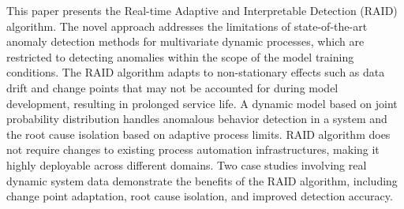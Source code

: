 This paper presents the Real-time Adaptive and Interpretable Detection (RAID) algorithm. The novel approach addresses the limitations of state-of-the-art anomaly detection methods for multivariate dynamic processes, which are restricted to detecting anomalies within the scope of the model training conditions. The RAID algorithm adapts to non-stationary effects such as data drift and change points that may not be accounted for during model development, resulting in prolonged service life. A dynamic model based on joint probability distribution handles anomalous behavior detection in a system and the root cause isolation based on adaptive process limits. RAID algorithm does not require changes to existing process automation infrastructures, making it highly deployable across different domains. Two case studies involving real dynamic system data demonstrate the benefits of the RAID algorithm, including change point adaptation, root cause isolation, and improved detection accuracy.
